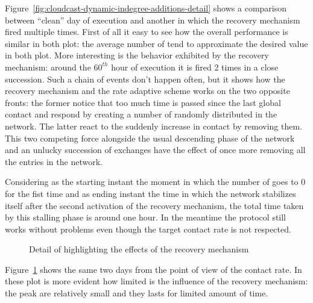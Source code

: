 Figure~\ref{fig:cloudcast-dynamic-indegree-additions-detail} shows a
comparison between ``clean'' day of execution and another in which the
recovery mechanism fired multiple times. First of all it easy to see
how the overall performance is similar in both plot: the average
number of \cloud \descriptors tend to approximate the desired value in
both plot.
More interesting is the behavior exhibited by the recovery mechanism:
around the $60^{th}$ hour of execution it is fired 2 times in a close
succession. Such a chain of events don't happen often, but it shows
how the recovery mechanism and the \cloud rate adaptive scheme works
on the two opposite fronts: the former notice that too much time is
passed since the last global \cloud contact and respond by creating a
number of \cloud \descriptors randomly distributed in the network. The
latter react to the suddenly increase in contact by removing
them.
This two competing force alongside the usual descending phase of the
network and an unlucky succession of \view exchanges have the effect
of once more removing all the \cloud entries in the network.

Considering as the starting instant the moment in which the number of
\cloud \descriptors goes to $0$ for the fist time and as ending
instant the time in which the network stabilizes itself after the
second activation of the recovery mechanism, the total time taken by
this stalling phase is around one hour. In the meantime the protocol
still works without problems even though the target \cloud contact
rate is not respected.

\begin{figure}[h!]
  \centering
  \caption{Detail of \cloud highlighting the effects of the recovery mechanism}
  \label{fig:cloudcast-dynamic-load-additions-detail}
\end{figure}

Figure~\ref{fig:cloudcast-dynamic-load-additions-detail} shows the
same two days from the point of view of the \cloud contact rate. In
these plot is more evident how limited is the influence of the
recovery mechanism: the peak are relatively small and they lasts for
limited amount of time.

